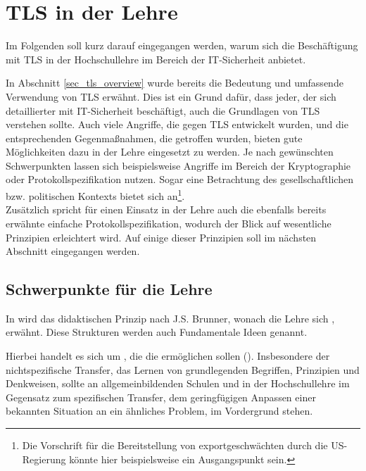 \chapter{TLS in der Lehre}

Im Folgenden soll kurz darauf eingegangen werden, warum sich die Beschäftigung mit TLS in der Hochschullehre im Bereich der IT-Sicherheit anbietet. %

In Abschnitt \ref{sec_tls_overview} wurde bereits die Bedeutung und umfassende Verwendung von TLS erwähnt. Dies ist ein Grund dafür, dass jeder, der sich detaillierter mit IT-Sicherheit beschäftigt, auch die Grundlagen von TLS verstehen sollte. Auch viele Angriffe, die gegen TLS entwickelt wurden, und die entsprechenden Gegenmaßnahmen, die getroffen wurden, bieten gute Möglichkeiten dazu in der Lehre eingesetzt zu werden. Je nach gewünschten Schwerpunkten lassen sich beispielsweise Angriffe im Bereich der Kryptographie oder Protokollspezifikation nutzen. Sogar eine Betrachtung des gesellschaftlichen bzw. politischen Kontexts bietet sich an\footnote{Die Vorschrift für die Bereitstellung von exportgeschwächten \ciphersuites{} durch die US-Regierung könnte hier beispielsweise ein Ausgangspunkt sein.}.\\
Zusätzlich spricht für einen Einsatz in der Lehre auch die ebenfalls bereits erwähnte einfache Protokollspezifikation, wodurch der Blick auf wesentliche Prinzipien erleichtert wird. Auf einige dieser Prinzipien soll im nächsten Abschnitt eingegangen werden.

\section{Schwerpunkte für die Lehre}

In \cite{schubert11} wird das didaktischen Prinzip nach J.S. Brunner, wonach die Lehre sich , erwähnt. Diese Strukturen werden auch Fundamentale Ideen genannt.

Hierbei handelt es sich um , die die  ermöglichen sollen (\cite{schubert11}). Insbesondere der nichtspezifische Transfer, das Lernen von grundlegenden Begriffen, Prinzipien und Denkweisen, sollte an allgemeinbildenden Schulen und in der Hochschullehre im Gegensatz zum spezifischen Transfer, dem geringfügigen Anpassen einer bekannten Situation an ein ähnliches Problem, im Vordergrund stehen.

